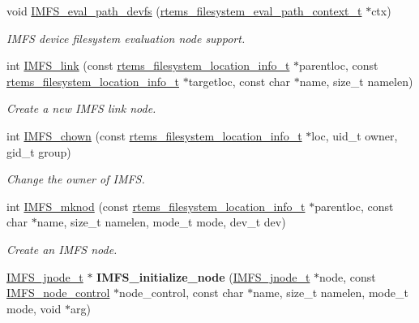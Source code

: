 \begin{DoxyCompactItemize}
\mbox{\label{group__IMFS_gafb8a8a9bc61bdf27523823e624dbdd35}} 
void \mbox{\hyperlink{group__IMFS_gafb8a8a9bc61bdf27523823e624dbdd35}{I\+M\+F\+S\+\_\+eval\+\_\+path\+\_\+devfs}} (\mbox{\hyperlink{structrtems__filesystem__eval__path__context__t}{rtems\+\_\+filesystem\+\_\+eval\+\_\+path\+\_\+context\+\_\+t}} $\ast$ctx)
\begin{DoxyCompactList}\small\item\em I\+M\+FS device filesystem evaluation node support. \end{DoxyCompactList}\item 
int \mbox{\hyperlink{group__IMFS_ga201e8fee9c1188bd9ded438a4a649a4e}{I\+M\+F\+S\+\_\+link}} (const \mbox{\hyperlink{group__LibIO_ga3252b3d31ee3c49ffff0b7604a676864}{rtems\+\_\+filesystem\+\_\+location\+\_\+info\+\_\+t}} $\ast$parentloc, const \mbox{\hyperlink{group__LibIO_ga3252b3d31ee3c49ffff0b7604a676864}{rtems\+\_\+filesystem\+\_\+location\+\_\+info\+\_\+t}} $\ast$targetloc, const char $\ast$name, size\+\_\+t namelen)
\begin{DoxyCompactList}\small\item\em Create a new I\+M\+FS link node. \end{DoxyCompactList}\item 
int \mbox{\hyperlink{group__IMFS_ga13f1b78c84bdc39e27b775df74dc000b}{I\+M\+F\+S\+\_\+chown}} (const \mbox{\hyperlink{group__LibIO_ga3252b3d31ee3c49ffff0b7604a676864}{rtems\+\_\+filesystem\+\_\+location\+\_\+info\+\_\+t}} $\ast$loc, uid\+\_\+t owner, gid\+\_\+t group)
\begin{DoxyCompactList}\small\item\em Change the owner of I\+M\+FS. \end{DoxyCompactList}\item 
int \mbox{\hyperlink{group__IMFS_gac77df9c3b3212bd349c35e278dd00e64}{I\+M\+F\+S\+\_\+mknod}} (const \mbox{\hyperlink{group__LibIO_ga3252b3d31ee3c49ffff0b7604a676864}{rtems\+\_\+filesystem\+\_\+location\+\_\+info\+\_\+t}} $\ast$parentloc, const char $\ast$name, size\+\_\+t namelen, mode\+\_\+t mode, dev\+\_\+t dev)
\begin{DoxyCompactList}\small\item\em Create an I\+M\+FS node. \end{DoxyCompactList}\item 
\mbox{\label{group__IMFS_gaf9dd420f1a8b9f68504f5c8e0238cc94}} 
\mbox{\hyperlink{structIMFS__jnode__tt}{I\+M\+F\+S\+\_\+jnode\+\_\+t}} $\ast$ {\bfseries I\+M\+F\+S\+\_\+initialize\+\_\+node} (\mbox{\hyperlink{structIMFS__jnode__tt}{I\+M\+F\+S\+\_\+jnode\+\_\+t}} $\ast$node, const \mbox{\hyperlink{structIMFS__node__control}{I\+M\+F\+S\+\_\+node\+\_\+control}} $\ast$node\+\_\+control, const char $\ast$name, size\+\_\+t namelen, mode\+\_\+t mode, void $\ast$arg)

\end{DoxyCompactItemize}
